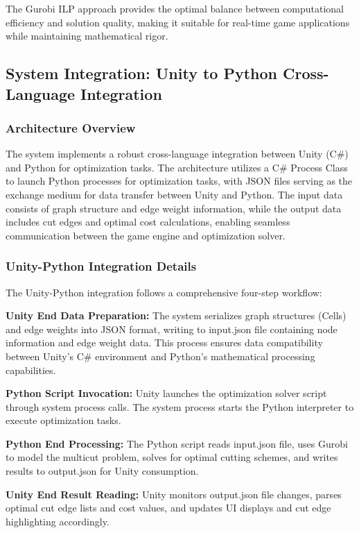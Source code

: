 \documentclass[english]{tudscrreprt}
\begin{document}
The Gurobi ILP approach provides the optimal balance between computational efficiency and solution quality, making it suitable for real-time game applications while maintaining mathematical rigor.

\subsection{System Integration: Unity to Python Cross-Language Integration}

\subsubsection{Architecture Overview}
The system implements a robust cross-language integration between Unity (C\#) and Python for optimization tasks. The architecture utilizes a C\# Process Class to launch Python processes for optimization tasks, with JSON files serving as the exchange medium for data transfer between Unity and Python. The input data consists of graph structure and edge weight information, while the output data includes cut edges and optimal cost calculations, enabling seamless communication between the game engine and optimization solver.

\subsubsection{Unity-Python Integration Details}
The Unity-Python integration follows a comprehensive four-step workflow:

\textbf{Unity End Data Preparation:} The system serializes graph structures (Cells) and edge weights into JSON format, writing to input.json file containing node information and edge weight data. This process ensures data compatibility between Unity's C\# environment and Python's mathematical processing capabilities.

\textbf{Python Script Invocation:} Unity launches the optimization solver script through system process calls. The system process starts the Python interpreter to execute optimization tasks.

\textbf{Python End Processing:} The Python script reads input.json file, uses Gurobi to model the multicut problem, solves for optimal cutting schemes, and writes results to output.json for Unity consumption.

\textbf{Unity End Result Reading:} Unity monitors output.json file changes, parses optimal cut edge lists and cost values, and updates UI displays and cut edge highlighting accordingly.
\end{document}
